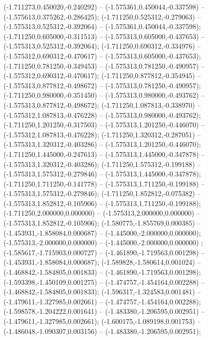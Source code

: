  (-1.711273,0.450020,-0.240292) -- (-1.575361,0.450044,-0.337598) -- (-1.575613,0.375262,-0.286425);
 (-1.711250,0.525312,-0.279063) -- (-1.575313,0.525312,-0.392064) -- (-1.575361,0.450044,-0.337598);
 (-1.711250,0.605000,-0.311513) -- (-1.575313,0.605000,-0.437653) -- (-1.575313,0.525312,-0.392064);
 (-1.711250,0.690312,-0.334976) -- (-1.575312,0.690312,-0.470617) -- (-1.575313,0.605000,-0.437653);
 (-1.711250,0.781250,-0.349453) -- (-1.575313,0.781250,-0.490957) -- (-1.575312,0.690312,-0.470617);
 (-1.711250,0.877812,-0.354945) -- (-1.575313,0.877812,-0.498672) -- (-1.575313,0.781250,-0.490957);
 (-1.711250,0.980000,-0.351450) -- (-1.575313,0.980000,-0.493762) -- (-1.575313,0.877812,-0.498672);
 (-1.711250,1.087813,-0.338970) -- (-1.575312,1.087813,-0.476228) -- (-1.575313,0.980000,-0.493762);
 (-1.711250,1.201250,-0.317503) -- (-1.575313,1.201250,-0.446070) -- (-1.575312,1.087813,-0.476228);
 (-1.711250,1.320312,-0.287051) -- (-1.575313,1.320312,-0.403286) -- (-1.575313,1.201250,-0.446070);
 (-1.711250,1.445000,-0.247613) -- (-1.575313,1.445000,-0.347878) -- (-1.575313,1.320312,-0.403286);
 (-1.711250,1.575312,-0.199188) -- (-1.575313,1.575312,-0.279846) -- (-1.575313,1.445000,-0.347878);
 (-1.711250,1.711250,-0.141778) -- (-1.575313,1.711250,-0.199188) -- (-1.575313,1.575312,-0.279846);
 (-1.711250,1.852812,-0.075382) -- (-1.575313,1.852812,-0.105906) -- (-1.575313,1.711250,-0.199188);
 (-1.711250,2.000000,0.000000) -- (-1.575313,2.000000,0.000000) -- (-1.575313,1.852812,-0.105906);
 (-1.580775,-1.855769,0.000385) -- (-1.453931,-1.858084,0.000687) -- (-1.445000,-2.000000,0.000000);
 (-1.575313,-2.000000,0.000000) -- (-1.445000,-2.000000,0.000000) ;
 (-1.585617,-1.715903,0.000727) -- (-1.461890,-1.719563,0.001298) -- (-1.453931,-1.858084,0.000687);
 (-1.589828,-1.580614,0.001024) -- (-1.468842,-1.584805,0.001833) -- (-1.461890,-1.719563,0.001298);
 (-1.593398,-1.450109,0.001275) -- (-1.474757,-1.454164,0.002288) -- (-1.468842,-1.584805,0.001833);
 (-1.596317,-1.324583,0.001481) -- (-1.479611,-1.327985,0.002661) -- (-1.474757,-1.454164,0.002288);
 (-1.598578,-1.204222,0.001641) -- (-1.483380,-1.206595,0.002951) -- (-1.479611,-1.327985,0.002661);
 (-1.600175,-1.089198,0.001753) -- (-1.486048,-1.090307,0.003156) -- (-1.483380,-1.206595,0.002951);

